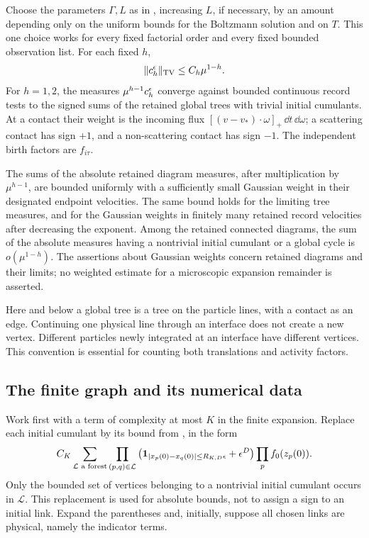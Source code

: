 \begin{theorem}\label{thm:sharp-cumulants}
Choose the parameters \(\Gamma,L\) as in
, increasing \(L\), if necessary,
by an amount depending only on the uniform bounds for the Boltzmann
solution and on \(T\).  This one choice works for every fixed factorial
order and every fixed bounded observation list.  For each fixed \(h\),
\begin{equation}\label{eq:sharp-full-cumulant}
 \|c_h^\epsilon\|_{\mathrm{TV}}\le C_h\mu^{1-h}.
\end{equation}
For \(h=1,2\), the measures \(\mu^{h-1}c_h^\epsilon\) converge against
bounded continuous record tests to the signed sums of the retained
global trees with trivial initial cumulants.  At a contact their weight
is the incoming flux
\([(v-v_*)\cdot\omega]_+\,\dd t\,\dd\omega\); a scattering contact
has sign \(+1\), and a non-scattering contact has sign \(-1\).
The independent birth factors are \(f_{i\tau}\).

The sums of the absolute retained diagram measures, after multiplication
by \(\mu^{h-1}\), are bounded uniformly with a sufficiently small
Gaussian weight in their designated endpoint velocities.  The same
bound holds for the limiting tree measures, and for the Gaussian weights
in finitely many retained record velocities after decreasing the exponent.
Among the retained connected diagrams, the sum of the absolute measures
having a nontrivial initial cumulant or a global cycle is
\(o(\mu^{1-h})\).  The assertions about Gaussian weights concern retained
diagrams and their limits; no weighted estimate for a microscopic
expansion remainder is asserted.
\end{theorem}

Here and below a global tree is a tree on the particle lines, with a
contact as an edge.  Continuing one physical line through an interface
does not create a new vertex.  Different particles newly integrated at
an interface have different vertices.  This convention is essential for
counting both translations and activity factors.

\subsection{The finite graph and its numerical data}

Work first with a term of complexity at most \(K\) in the finite
expansion.  Replace each initial cumulant by its bound from
, in the form
\begin{equation}\label{eq:sharp-initial-link}
 C_K\sum_{\mathcal L\text{ a forest}}
 \prod_{(p,q)\in\mathcal L}
 \left(\mathbf 1_{|x_p(0)-x_q(0)|\le R_{K,D}\epsilon}+\epsilon^D\right)
 \prod_p f_0(z_p(0)).
\end{equation}
Only the bounded set of vertices belonging to a nontrivial initial
cumulant occurs in \(\mathcal L\).  This replacement is used for absolute
bounds, not to assign a sign to an initial link.  Expand the parentheses
and, initially, suppose all chosen links are physical, namely the
indicator terms.

